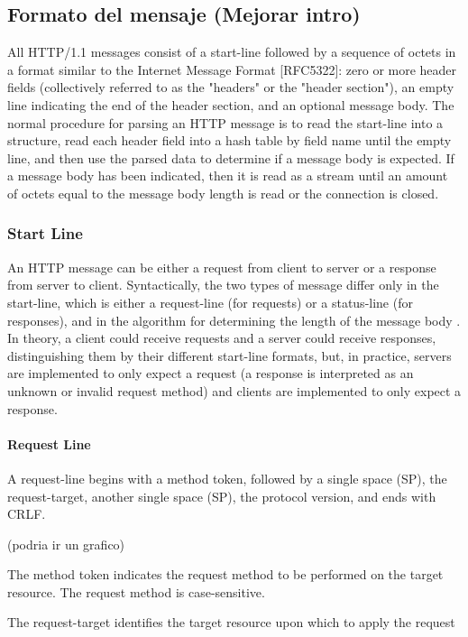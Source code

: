 \subsection{Formato del mensaje (Mejorar intro)}

All HTTP/1.1 messages consist of a start-line followed by a sequence
of octets in a format similar to the Internet Message Format
[RFC5322]: zero or more header fields (collectively referred to as
the "headers" or the "header section"), an empty line indicating the
end of the header section, and an optional message body.
The normal procedure for parsing an HTTP message is to read the
   start-line into a structure, read each header field into a hash table
   by field name until the empty line, and then use the parsed data to
   determine if a message body is expected.  If a message body has been
   indicated, then it is read as a stream until an amount of octets
   equal to the message body length is read or the connection is closed.

 
\subsubsection*{Start Line}
An HTTP message can be either a request from client to server or a
   response from server to client.  Syntactically, the two types of
   message differ only in the start-line, which is either a request-line
   (for requests) or a status-line (for responses), and in the algorithm
   for determining the length of the message body .
   In theory, a client could receive requests and a server could receive
   responses, distinguishing them by their different start-line formats,
   but, in practice, servers are implemented to only expect a request (a
   response is interpreted as an unknown or invalid request method) and
   clients are implemented to only expect a response.

     
   \paragraph*{Request Line}
A request-line begins with a method token, followed by a single space
   (SP), the request-target, another single space (SP), the protocol
   version, and ends with CRLF.

     (podria ir un grafico)

   The method token indicates the request method to be performed on the
   target resource.  The request method is case-sensitive.


   The request-target identifies the target resource upon which to apply
   the request



